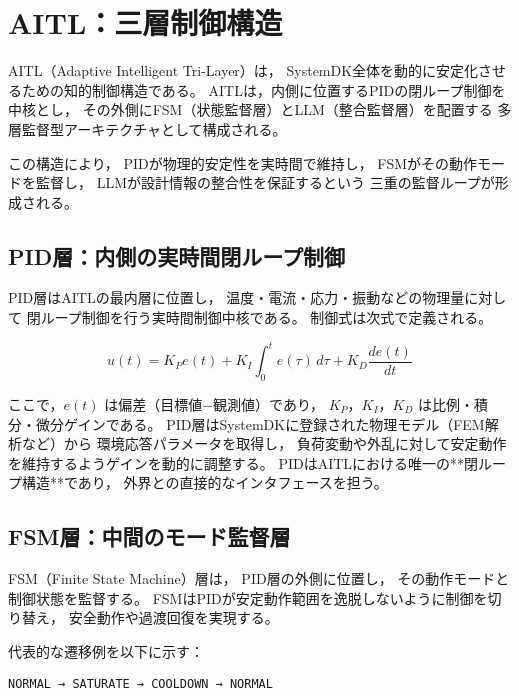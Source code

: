 \section{AITL：三層制御構造}

AITL（Adaptive Intelligent Tri-Layer）は，
SystemDK全体を動的に安定化させるための知的制御構造である。
AITLは，内側に位置するPIDの閉ループ制御を中核とし，
その外側にFSM（状態監督層）とLLM（整合監督層）を配置する
多層監督型アーキテクチャとして構成される。

この構造により，
PIDが物理的安定性を実時間で維持し，
FSMがその動作モードを監督し，
LLMが設計情報の整合性を保証するという
三重の監督ループが形成される。

\subsection{PID層：内側の実時間閉ループ制御}
PID層はAITLの最内層に位置し，
温度・電流・応力・振動などの物理量に対して
閉ループ制御を行う実時間制御中核である。
制御式は次式で定義される。

\begin{equation}
u(t) = K_P e(t) + K_I \int_{0}^{t} e(\tau)\,d\tau + K_D \frac{de(t)}{dt}
\end{equation}

ここで，$e(t)$ は偏差（目標値−観測値）であり，
$K_P$，$K_I$，$K_D$ は比例・積分・微分ゲインである。
PID層はSystemDKに登録された物理モデル（FEM解析など）から
環境応答パラメータを取得し，
負荷変動や外乱に対して安定動作を維持するようゲインを動的に調整する。
PIDはAITLにおける唯一の**閉ループ構造**であり，
外界との直接的なインタフェースを担う。

\subsection{FSM層：中間のモード監督層}
FSM（Finite State Machine）層は，
PID層の外側に位置し，
その動作モードと制御状態を監督する。
FSMはPIDが安定動作範囲を逸脱しないように制御を切り替え，
安全動作や過渡回復を実現する。

代表的な遷移例を以下に示す：

\begin{center}
\texttt{NORMAL → SATURATE → COOLDOWN → NORMAL}
\end{center}

